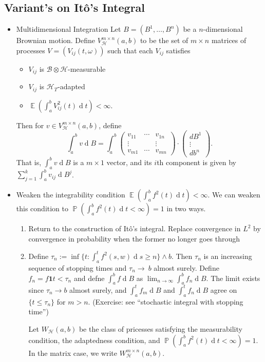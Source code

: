 \documentclass[11pt, a4paper]{memoir}
\theoremstyle{change}
\theoremstyle{plain}
\theoremstyle{nonumberplain}
\DeclareMathOperator{\pr}{{\mathbb{P}}}
\DeclareMathOperator{\E}{{\mathbb{E}}}
\renewcommand{\d}[1]{\ensuremath{\operatorname{d}\!{#1}}}
\newcommand{\idc}{\mathbf{1}}
\numberwithin{equation}{section}
\begin{document}
\subsection{Variant's on Itô's Integral}
\begin{itemize}
    \item Multidimensional Integration
        Let $B=(B^1,\ldots,B^n)$ be a $n$-dimensional Brownian motion.
        Define $V_{\mathcal{H}}^{m\times n}(a,b)$ to be the set of $m\times n$ matrices of processes $V=(V_{ij}(t,\omega))$ such that each $V_{ij}$ satisfies
        \begin{itemize}[nl]
            \item $V_{ij}$ is $\mathcal{B}\otimes\mathcal{H}$-measurable
            \item $V_{ij}$ is $\mathcal{H}_T$-adapted
            \item $\E(\int_a^bV_{ij}^2(t)\d{t})<\infty$.
        \end{itemize}
        Then for $v\in V_{\mathcal{H}}^{m\times n}(a,b)$, define
        \begin{equation*}
            \int_a^b v\d{B}=\int_a^b\begin{pmatrix}v_{11} &\cdots & v_{1n}\\\vdots&&\vdots\\v_{m1}&\cdots&v_{mn}\end{pmatrix}\cdot\begin{pmatrix}dB^1\\\vdots\\db^n\end{pmatrix}.
        \end{equation*}
        That is, $\int_a^b v\d{B}$ is a $m\times 1$ vector, and its $i$th component is given by $\sum_{j=1}^k\int_a^b v_{ij}\d{B^j}$.

    \item Weaken the integrability condition $\E(\int_a^bf^2(t)\d{t})<\infty$.
        We can weaken this condition to $\pr(\int_a^bf^2(t)\d{t}<\infty)=1$ in two ways.
        \begin{enumerate}[nl]
            \item Return to the construction of Itô's integral.
                Replace convergence in $L^2$ by convergence in probability when the former no longer goes through
            \item Define $\tau_n:=\inf\{t:\int_a^t f^2(s,w)\d{s}\geq n\}\wedge b$.
                Then $\tau_n$ is an increasing sequence of stopping times and $\tau_n\to\ b$ almost surely.
                Define $f_n=f\idc{t<\tau_n}$ and defne $\int_a^b f\d{B}$ as $\lim_{n\to\infty}\int_a^b f_n\d{B}$.
                The limit exists since $\tau_n\to b$ almost surely, and $\int_a^tf_m\d{B}$ and $\int_a^tf_n\d{B}$ agree on $\{t\leq\tau_n\}$ for $m>n$.
                (Exercise: see ``stochastic integral with stopping time'')

                Let $W_{\mathcal{H}}(a,b)$ be the class of pricesses satisfying the measurability condition, the adaptedness condition, and $\pr(\int_a^bf^2(t)\d{t}<\infty)=1$.
                In the matrix case, we write $W^{m\times n}_{\mathcal{H}}(a,b)$.
        \end{enumerate}
\end{itemize}
\end{document}
